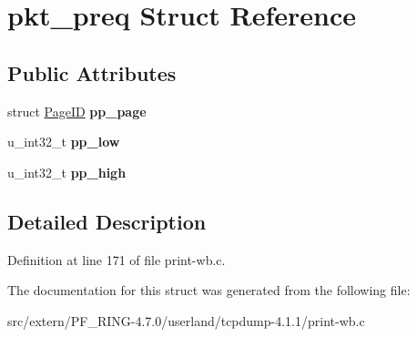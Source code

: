 \hypertarget{structpkt__preq}{
\section{pkt\_\-preq Struct Reference}
\label{structpkt__preq}
}
\subsection*{Public Attributes}
\begin{DoxyCompactItemize}
\item 
\hypertarget{structpkt__preq_a7830262201f1fbd4b0d85025ded5e33c}{
struct \hyperlink{struct_page_i_d}{PageID} {\bfseries pp\_\-page}}
\label{structpkt__preq_a7830262201f1fbd4b0d85025ded5e33c}

\item 
\hypertarget{structpkt__preq_a2bb9ca4f82153bf0bc0e4b8db8001c8c}{
u\_\-int32\_\-t {\bfseries pp\_\-low}}
\label{structpkt__preq_a2bb9ca4f82153bf0bc0e4b8db8001c8c}

\item 
\hypertarget{structpkt__preq_a834761656dd55663fb31a19e360296c0}{
u\_\-int32\_\-t {\bfseries pp\_\-high}}
\label{structpkt__preq_a834761656dd55663fb31a19e360296c0}

\end{DoxyCompactItemize}


\subsection{Detailed Description}


Definition at line 171 of file print-\/wb.c.



The documentation for this struct was generated from the following file:\begin{DoxyCompactItemize}
\item 
src/extern/PF\_\-RING-\/4.7.0/userland/tcpdump-\/4.1.1/print-\/wb.c\end{DoxyCompactItemize}
